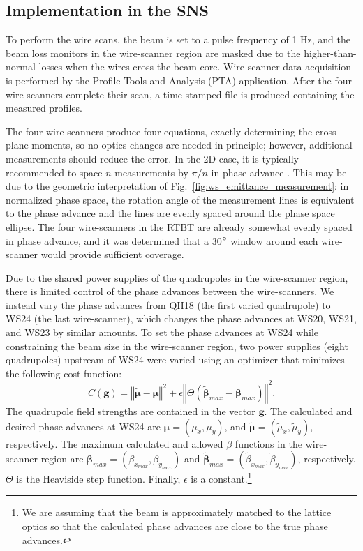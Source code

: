 \subsection{Implementation in the SNS}

To perform the wire scans, the beam is set to a pulse frequency of 1 Hz, and the beam loss monitors in the wire-scanner region are masked due to the higher-than-normal losses when the wires cross the beam core. Wire-scanner data acquisition is performed by the Profile Tools and Analysis (PTA) application. After the four wire-scanners complete their scan, a time-stamped file is produced containing the measured profiles.

The four wire-scanners produce four equations, exactly determining the cross-plane moments, so no optics changes are needed in principle; however, additional measurements should reduce the error. In the 2D case, it is typically recommended to space $n$ measurements by $\pi / n$ in phase advance \cite{book:Minty2003}. This may be due to the geometric interpretation of Fig.~\ref{fig:ws_emittance_measurement}: in normalized phase space, the rotation angle of the measurement lines is equivalent to the phase advance and the lines are evenly spaced around the phase space ellipse. The four wire-scanners in the RTBT are already somewhat evenly spaced in phase advance, and it was determined that a 30$\degree$ window around each wire-scanner would provide sufficient coverage. 

Due to the shared power supplies of the quadrupoles in the wire-scanner region, there is limited control of the phase advances between the wire-scanners. We instead vary the phase advances from QH18 (the first varied quadrupole) to WS24 (the last wire-scanner), which changes the phase advances at WS20, WS21, and WS23 by similar amounts. To set the phase advances at WS24 while constraining the beam size in the wire-scanner region, two power supplies (eight quadrupoles) upstream of WS24 were varied using an optimizer that minimizes the following cost function:
%
\begin{equation}
    C(\mathbf{g}) = \left\Vert{\tilde{\bm{\mu}} - \bm{\mu} }\right\Vert^2
    + 
    \epsilon
    \left\Vert
    \Theta\left(
        \tilde{\bm{\beta}}_{max} - \bm{\beta}_{max}
    \right)
    \right\Vert^2
    .
\end{equation}
%
The quadrupole field strengths are contained in the vector $\mathbf{g}$. The calculated and desired phase advances at WS24 are $\bm{\mu} = (\mu_x, \mu_y)$, and $\tilde{\bm{\mu}} = (\tilde{\mu}_x, \tilde{\mu}_y)$, respectively. The maximum calculated and allowed $\beta$ functions in the wire-scanner region are $\bm{\beta}_{max} = (\beta_{x_{max}}, \beta_{y_{max}})$ and $\tilde{\bm{\beta}}_{max} = (\tilde{\beta}_{x_{max}}, \tilde{\beta}_{y_{max}})$, respectively. $\Theta$ is the Heaviside step function. Finally, $\epsilon$ is a constant.\footnote{We are assuming that the beam is approximately matched to the lattice optics so that the calculated phase advances are close to the true phase advances.}

